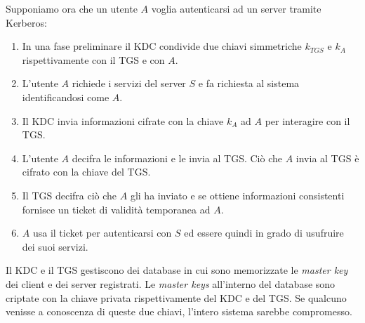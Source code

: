 Supponiamo ora che un utente $A$ voglia autenticarsi ad un server tramite Kerberos:
\begin{enumerate}
	\item In una fase preliminare il KDC condivide due chiavi simmetriche $k_{TGS}$ e $k_A$ rispettivamente con il TGS
	      e con $A$.
	\item L'utente $A$ richiede i servizi del server $S$ e fa richiesta al sistema identificandosi come $A$.
	\item Il KDC invia informazioni cifrate con la chiave $k_A$ ad $A$ per interagire con il TGS.
	\item L'utente $A$ decifra le informazioni e le invia al TGS. Ciò che $A$ invia al TGS è cifrato con la chiave
	      del TGS.
	\item Il TGS decifra ciò che $A$ gli ha inviato e se ottiene informazioni consistenti fornisce un ticket di
	      validità temporanea ad $A$.
	\item $A$ usa il ticket per autenticarsi con $S$ ed essere quindi in grado di usufruire dei suoi servizi.
\end{enumerate}
Il KDC e il TGS gestiscono dei database in cui sono memorizzate le \emph{master key} dei client e dei server registrati.
Le \emph{master keys} all'interno del database sono criptate con la chiave privata rispettivamente del KDC e del TGS.
Se qualcuno venisse a conoscenza di queste due chiavi, l'intero sistema sarebbe compromesso.